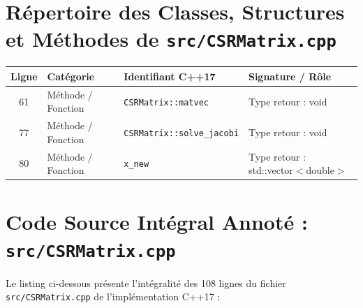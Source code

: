 \documentclass[10pt,a4paper,oneside]{book}
\begin{document}
\section{Répertoire des Classes, Structures et Méthodes de \texttt{src/CSRMatrix.cpp}}
\begin{center}\small
\begin{tabular}{clll}
\toprule
\textbf{Ligne} & \textbf{Catégorie} & \textbf{Identifiant C++17} & \textbf{Signature / Rôle} \\
\midrule
61 & Méthode / Fonction & \texttt{CSRMatrix::matvec} & Type retour : void \\
77 & Méthode / Fonction & \texttt{CSRMatrix::solve\_jacobi} & Type retour : void \\
80 & Méthode / Fonction & \texttt{x\_new} & Type retour : std::vector$<$double$>$ \\
\bottomrule
\end{tabular}
\end{center}

\section{Code Source Intégral Annoté : \texttt{src/CSRMatrix.cpp}}
Le listing ci-dessous présente l'intégralité des 108 lignes du fichier \texttt{src/CSRMatrix.cpp} de l'implémentation C++17 :
\end{document}
